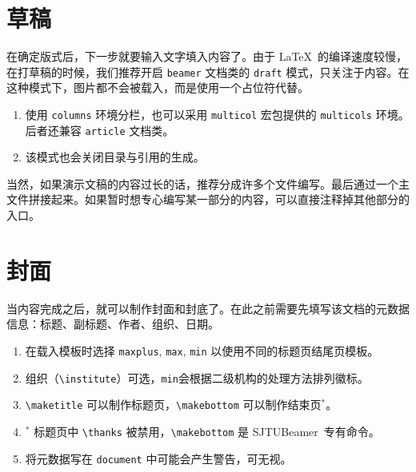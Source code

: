 \documentclass[
    UTF8,
    heading=true,
    12pt,
    a4paper
]{ctexrep}
\newenvironment{commentlist}{\begin{enumerate}\small}{\end{enumerate}}
\def\themename{\textsf{SJTUBeamer}}
\begin{document}

\chapter{草稿}

在确定版式后，下一步就要输入文字填入内容了。由于 \LaTeX\ 的编译速度较慢，在打草稿的时候，我们推荐开启 \texttt{beamer} 文档类的 \texttt{draft} 模式，只关注于内容。在这种模式下，图片都不会被载入，而是使用一个占位符代替。


\begin{commentlist}
  \item 使用 \texttt{columns} 环境分栏，也可以采用 \texttt{multicol} 宏包提供的 \texttt{multicols} 环境。后者还兼容 \texttt{article} 文档类。
  \item 该模式也会关闭目录与引用的生成。
\end{commentlist}

\clearpage

当然，如果演示文稿的内容过长的话，推荐分成许多个文件编写。最后通过一个主文件拼接起来。如果暂时想专心编写某一部分的内容，可以直接注释掉其他部分的入口。


\chapter{封面}

当内容完成之后，就可以制作封面和封底了。在此之前需要先填写该文档的元数据信息：标题、副标题、作者、组织、日期。


\begin{commentlist}
  \item 在载入模板时选择 \texttt{maxplus}, \texttt{max}, \texttt{min} 以使用不同的标题页结尾页模板。
  \item 组织（\texttt{\textbackslash{}institute}）可选，\texttt{min}会根据二级机构的处理方法排列徽标。
  \item \texttt{\textbackslash{}maketitle} 可以制作标题页，\texttt{\textbackslash{}makebottom} 可以制作结束页$^*$。
  \item$^*$ 标题页中 \texttt{\textbackslash{}thanks} 被禁用，\texttt{\textbackslash{}makebottom} 是 \themename\ 专有命令。
  \item[\faExclamationTriangle] 将元数据写在 \texttt{document} 中可能会产生警告，可无视。
\end{commentlist}
\end{document}
